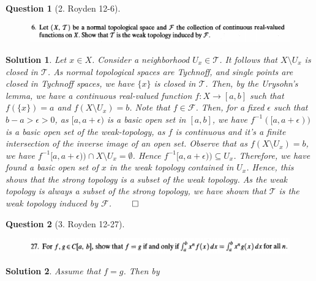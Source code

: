 \documentclass{article} %
\theoremstyle{quest}
\newtheorem*{question}{Question}
\newtheorem*{solution}{Solution}
\begin{document}
\begin{question}[2. Royden 12-6]
\hfill
\begin{figure}[h!]
  \centering
    \includegraphics[width=1\textwidth]{12-6}
\end{figure}
\end{question}
\begin{solution}
Let $x \in X$. Consider a neighborhood $U_x \in \mathscr{T}$. It follows
that $X \setminus U_x$ is closed in $\mathscr{T}$. As normal topological 
spaces are Tychnoff, and single points are closed in Tychnoff spaces, we have
$\{ x\}$ is closed in $\mathscr{T}$. Then, by the Urysohn's lemma, 
we have a continuous real-valued function
$f:X \to [a,b]$ such that $f(\{x\} ) = a$ and
$f(X\setminus U_x ) = b$. Note that $f \in \mathscr{F}$.
Then, for a fixed $\epsilon$ 
such that $b -a > \epsilon > 0$,
as $[a,a+\epsilon)$ is a basic open set in $[a,b]$,
we have $f^{-1}([a,a+\epsilon))$ is a basic open set of the weak-topology,
as $f$ is continuous and it's a finite intersection of the inverse
image of an open set.
Observe that as $f(X \setminus U_x) = b$, we have  
$f^{-1}[a,a+\epsilon)) \cap X \setminus  U_x = \emptyset$. Hence
$f^{-1}[a,a+\epsilon)) \subseteq U_x$. Therefore, we have found a basic 
open set of $x$ in the weak topology contained in $U_x$. Hence, this shows
that the strong topology is a subset of the weak topology. As the
weak topology is always a subset of the strong topology, we have shown
that $\mathscr{T}$ is the weak topology induced by $\mathscr{F}$. 
\hfill $\qed$


\end{solution}

\newpage

\begin{question}[3. Royden 12-27]
\hfill
\begin{figure}[h!]
  \centering
    \includegraphics[width=1\textwidth]{12-37}
\end{figure}
\end{question}
\begin{solution}
Assume that $f = g$. Then by 

\end{solution}

\newpage
\end{document}

